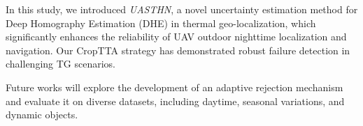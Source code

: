 In this study, we introduced \textit{UASTHN}, a novel uncertainty estimation method for Deep Homography Estimation (DHE) in thermal geo-localization, which significantly enhances the reliability of UAV outdoor nighttime localization and navigation. Our CropTTA strategy has demonstrated robust failure detection in challenging TG scenarios. 

Future works will explore the development of an adaptive rejection mechanism and evaluate it on diverse datasets, including daytime, seasonal variations, and dynamic objects.